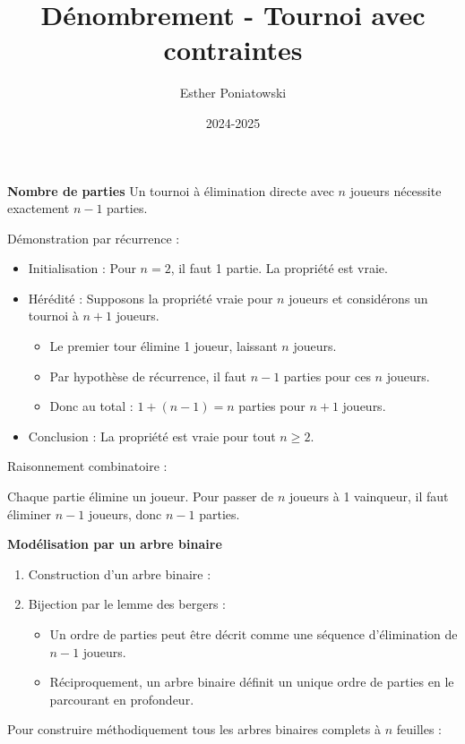 \documentclass[10pt,a4paper]{article}
\title{Dénombrement - Tournoi avec contraintes}
\author{Esther Poniatowski}
\date{2024-2025}
\begin{document}
\q \textbf{Nombre de parties}
Un tournoi à élimination directe avec $n$ joueurs nécessite exactement $n-1$ parties.

Démonstration par récurrence :
\begin{itemize}
     \item Initialisation : Pour $n = 2$, il faut 1 partie. La propriété est vraie.
     \item Hérédité : Supposons la propriété vraie pour $n$ joueurs et considérons un tournoi à
     $n+1$ joueurs.
     \begin{itemize}
          \item Le premier tour élimine 1 joueur, laissant $n$ joueurs.
          \item Par hypothèse de récurrence, il faut $n-1$ parties pour ces $n$ joueurs.
          \item Donc au total : $1 + (n-1) = n$ parties pour $n+1$ joueurs.
     \end{itemize}
     \item Conclusion : La propriété est vraie pour tout $n \geq 2$.
\end{itemize}

Raisonnement combinatoire :

Chaque partie élimine un joueur. Pour passer de $n$ joueurs à 1 vainqueur, il faut éliminer $n-1$
joueurs, donc $n-1$ parties.


\q \textbf{Modélisation par un arbre binaire}
\begin{enumerate}

    \item Construction d'un arbre binaire :


    \item Bijection par le lemme des bergers :
    \begin{itemize}
        \item Un ordre de parties peut être décrit comme une séquence d'élimination de \( n-1 \)
        joueurs.
        \item Réciproquement, un arbre binaire définit un unique ordre de parties en le parcourant
        en profondeur.
    \end{itemize}
\end{enumerate}

Pour construire méthodiquement tous les arbres binaires complets à \( n \) feuilles :
\end{document}
